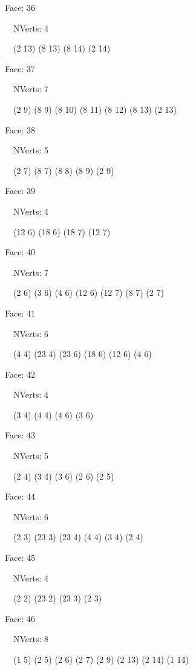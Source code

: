 \documentclass{article}
\begin{document}
{\footnotesize 

Face: 36

\   \    NVerts: 4

 \   \   (2 13) (8 13) (8 14) (2 14)}

{\footnotesize 

Face: 37

\   \    NVerts: 7

 \   \   (2 9) (8 9) (8 10) (8 11) (8 12) (8 13) (2 13)}

{\footnotesize 

Face: 38

\   \    NVerts: 5

 \   \   (2 7) (8 7) (8 8) (8 9) (2 9)}

{\footnotesize 

Face: 39

\   \    NVerts: 4

 \   \   (12 6) (18 6) (18 7) (12 7)}

{\footnotesize 

Face: 40

\   \    NVerts: 7

 \   \   (2 6) (3 6) (4 6) (12 6) (12 7) (8 7) (2 7)}

{\footnotesize 

Face: 41

\   \    NVerts: 6

 \   \   (4 4) (23 4) (23 6) (18 6) (12 6) (4 6)}

{\footnotesize 

Face: 42

\   \    NVerts: 4

 \   \   (3 4) (4 4) (4 6) (3 6)}

{\footnotesize 

Face: 43

\   \    NVerts: 5

 \   \   (2 4) (3 4) (3 6) (2 6) (2 5)}

{\footnotesize 

Face: 44

\   \    NVerts: 6

 \   \   (2 3) (23 3) (23 4) (4 4) (3 4) (2 4)}

{\footnotesize 

Face: 45

\   \    NVerts: 4

 \   \   (2 2) (23 2) (23 3) (2 3)}

{\footnotesize 

Face: 46

\   \    NVerts: 8

 \   \   (1 5) (2 5) (2 6) (2 7) (2 9) (2 13) (2 14) (1 14)}
\end{document}
